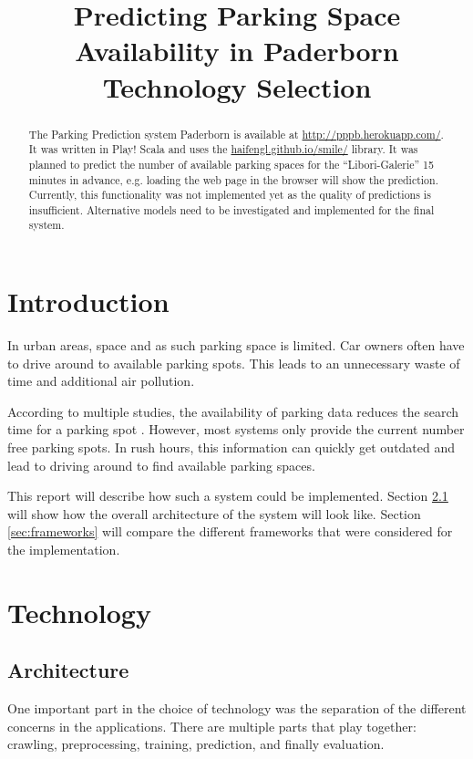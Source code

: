 

\renewcommand{\todo}{}



\title{Predicting Parking Space Availability in Paderborn\\
Technology Selection}
\maketitle

\begin{abstract}
The Parking Prediction system Paderborn is available at \url{http://pppb.herokuapp.com/}. It was written in Play! Scala and uses the \href{smile}{haifengl.github.io/smile/} library. It was planned to predict the number of available parking spaces for the ``Libori-Galerie'' 15 minutes in advance, e.g. loading the web page in the browser will show the prediction. Currently, this functionality was not implemented yet as the quality of predictions is insufficient. Alternative models need to be investigated and implemented for the final system. 
 \end{abstract}

\section{Introduction}

In urban areas, space and as such parking space is limited. Car owners often have to drive around to available parking spots. This leads to an unnecessary waste of time and additional air pollution. 

According to multiple studies, the availability of parking data reduces the search time for a parking spot \cite{Asakura1994}\cite{Caicedo2010228}. However, most systems only provide the current number free parking spots. In rush hours, this information can quickly get outdated and lead to driving around to find available parking spaces.

This report will describe how such a system could be implemented. Section \ref{sec:architecture} will show how the overall architecture of the system will look like. Section \ref{sec:frameworks} will compare the different frameworks that were considered for the implementation. 

\section{Technology}

\subsection{Architecture}\label{sec:architecture}
One important part in the choice of technology was the separation of the different concerns in the applications. There are multiple parts that play together: crawling, preprocessing, training, prediction, and finally evaluation. 

